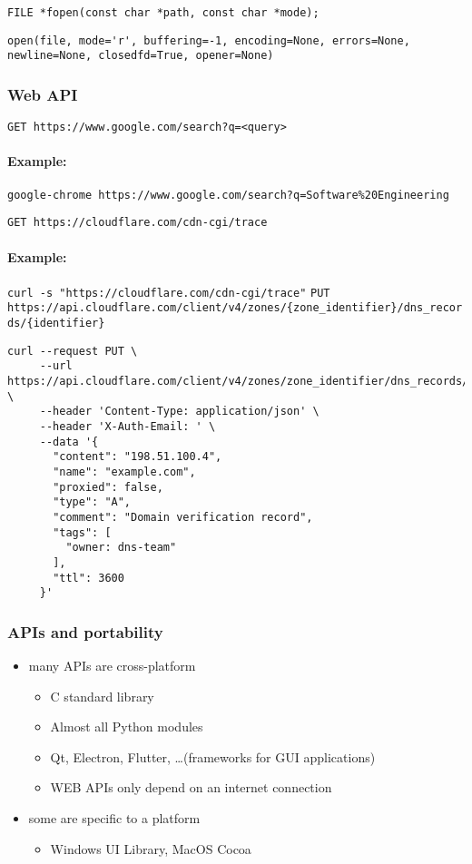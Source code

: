 \documentclass[12pt]{article}
\begin{document}
\verb|FILE *fopen(const char *path, const char *mode);|

\verb|open(file, mode='r', buffering=-1, encoding=None, errors=None, newline=None, closedfd=True, opener=None)|

\subsubsection{Web API}

\verb|GET https://www.google.com/search?q=<query>|

\paragraph{Example:}

\verb|google-chrome https://www.google.com/search?q=Software%20Engineering|

\verb|GET https://cloudflare.com/cdn-cgi/trace|

\paragraph{Example:}

\verb|curl -s "https://cloudflare.com/cdn-cgi/trace"|
\texttt{PUT https://api.cloudflare.com/client/v4/zones/\{zone\_identifier\}/dns\_records/\{identifier\}}

\begin{verbatim}
curl --request PUT \
     --url https://api.cloudflare.com/client/v4/zones/zone_identifier/dns_records/identifier \
     --header 'Content-Type: application/json' \
     --header 'X-Auth-Email: ' \
     --data '{
       "content": "198.51.100.4",
       "name": "example.com",
       "proxied": false,
       "type": "A",
       "comment": "Domain verification record",
       "tags": [
         "owner: dns-team"
       ],
       "ttl": 3600
     }'
\end{verbatim}
\subsubsection{APIs and portability}
\begin{itemize}
  \item many APIs are cross-platform
  \begin{itemize}
    \item C standard library
    \item Almost all Python modules
    \item Qt, Electron, Flutter, \ldots (frameworks for GUI applications)
    \item WEB APIs only depend on an internet connection
  \end{itemize}
  \item some are specific to a platform
  \begin{itemize}
    \item Windows UI Library, MacOS Cocoa
  \end{itemize}
\end{itemize}
\end{document}
